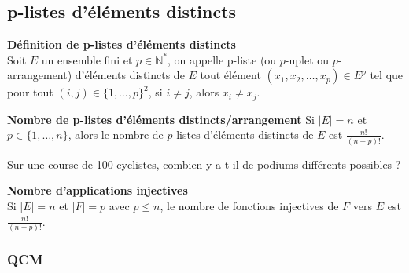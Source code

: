 \documentclass[../PolyS4.tex]{subfiles}
\begin{document}
\subsection{p-listes d'éléments distincts}
\begin{Def}\textbf{Définition de p-listes d'éléments distincts} \\
Soit \( E \) un ensemble fini et \( p \in \mathbb{N}^* \), on appelle p-liste (ou \( p \)-uplet ou \( p \)-arrangement) d'éléments distincts de \( E \) tout élément \( (x_1, x_2, \ldots, x_p) \in E^p \) tel que pour tout \( (i, j) \in \{1, \ldots, p\}^2 \), si \( i \neq j \), alors \( x_i \neq x_j \).
\end{Def}
\begin{Prop}\textbf{Nombre de p-listes d'éléments distincts/arrangement} 
Si \( |E| = n \) et \( p \in \{1, \ldots, n\} \), alors le nombre de \( p \)-listes d'éléments distincts de \( E \) est \( \frac{n!}{(n - p)!} \).\\
\end{Prop}



\begin{Ex} Sur une course de 100 cyclistes, combien y a-t-il de podiums différents possibles ?
\end{Ex}

%
\begin{Prop}\textbf{Nombre d'applications injectives}\\
Si \( |E| = n \) et \( |F| = p \) avec \( p \leq n \), le nombre de fonctions injectives de \( F \) vers \( E \) est \( \frac{n!}{(n - p)!} \).\\

\end{Prop}

\newpage

\subsubsection*{QCM}
\end{document}

